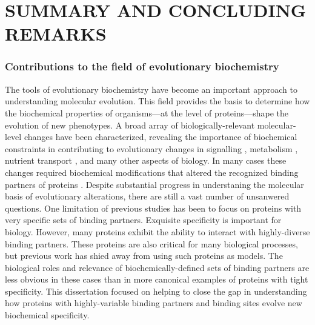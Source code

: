 \chapter{SUMMARY AND CONCLUDING REMARKS}

\subsection{Contributions to the field of evolutionary biochemistry }

The tools of evolutionary biochemistry have become an important approach
to understanding molecular evolution. This field provides the basis
to determine how the biochemical properties of organisms---at the level
of proteins---shape the evolution of new phenotypes. A broad array of
biologically-relevant molecular-level changes have been characterized,
revealing the importance of biochemical constraints in contributing
to evolutionary changes in signalling \citep{mckeown_evolution_2014},
metabolism \citep{boucher_atomic-resolution_2014}, nutrient transport
\citep{clifton_ancestral_2016}, and many other aspects of biology.
In many cases these changes required biochemical modifications that
altered the recognized binding partners of proteins \citep{eick_evolution_2012,boucher_atomic-resolution_2014,hudson_distal_2015,alhindi_protein_2017,risso_hyperstability_2013,soskine_mutational_2010,carroll_evolution_2008}.
Despite substantial progress in understaning the molecular basis of
evolutionary alterations, there are still a vast number of unsanwered
questions. One limitation of previous studies has been to focus on
proteins with very specific sets of binding partners. Exquisite specificity
is important for biology. However, many proteins exhibit the ability
to interact with highly-diverse binding partners. These proteins are
also critical for many biological processes, but previous work has
shied away from using such proteins as models. The biological roles
and relevance of biochemically-defined sets of binding partners are
less obvious in these cases than in more canonical examples of proteins
with tight specificity. This dissertation focused on helping to close
the gap in understanding how proteins with highly-variable binding
partners and binding sites evolve new biochemical specificity. 

